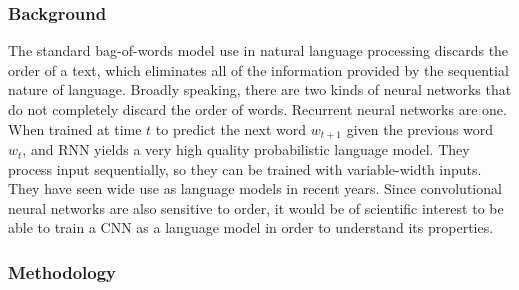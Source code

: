 
\subsubsection{Background} 

The standard bag-of-words model use in natural language processing
discards the order of a text, which eliminates all of the information
provided by the sequential nature of language.  Broadly speaking, there
are two kinds of neural networks that do not completely discard the
order of words.  Recurrent neural networks are one.  When trained 
at time $t$ to predict the next word $w_{t+1}$ given the previous
word $w_t$, and RNN yields a very high quality probabilistic language
model.  They process input sequentially, so they can be trained with
variable-width inputs.  They have seen wide use as language models 
in recent years.  Since convolutional neural networks are also sensitive
to order, it would be of scientific interest to be able to train a CNN
as a language model in order to understand its properties.

\subsubsection{Methodology}

